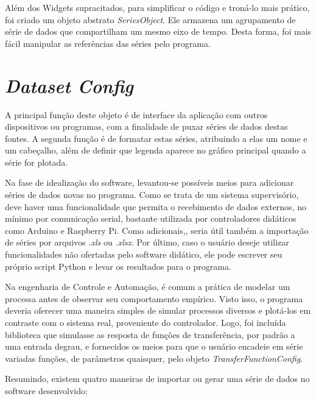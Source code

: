 Além dos Widgets supracitados, para simplificar o código e troná-lo mais prático, foi criado um objeto abstrato \emph{SeriesObject}. Ele armazena um agrupamento de série de dados que compartilham um mesmo eixo de tempo. Desta forma, foi mais fácil manipular as referências das séries pelo programa.

\section{\emph{Dataset Config}}

A principal função deste objeto é de interface da aplicação com outros dispositivos ou programas, com a finalidade de puxar séries de dados destas fontes. A segunda função é de formatar estas séries, atribuindo a elas um nome e um cabeçalho, além de definir que legenda aparece no gráfico principal quando a série for plotada.

Na fase de idealização do software, levantou-se possíveis meios para adicionar séries de dados novas no programa. Como se trata de um sistema supervisório, deve haver uma funcionalidade que permita o recebimento de dados externos, no mínimo por comunicação serial, bastante utilizada por controladores didáticos como Arduino e Raspberry Pi. Como adicionais,, seria útil também a importação de séries por arquivos \emph{.xls} ou \emph{.xlsx}. Por último, caso o usuário deseje utilizar funcionalidades não ofertadas pelo software didático, ele pode escrever seu próprio script Python e levar os resultados para o programa.

Na engenharia de Controle e Automação, é comum a prática de modelar um processa antes de observar seu comportamento empírico. Visto isso, o programa deveria oferecer uma maneira simples de simular processos diversos e plotá-los em contraste com o sistema real, proveniente do controlador. Logo, foi incluída biblioteca que simulasse as resposta de funções de transferência, por padrão a uma entrada degrau, e fornecidos os meios para que o usuário encadeie em série variadas funções, de parâmetros quaisquer, pelo objeto \emph{TransferFunctionConfig}.

Resumindo, existem quatro maneiras de importar ou gerar uma série de dados no software desenvolvido:

